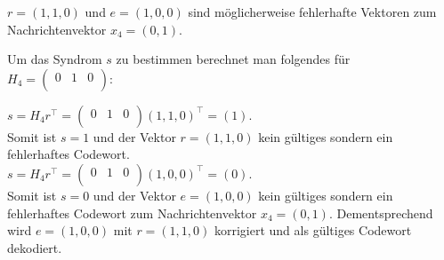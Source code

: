 \begin{Beispiel}[Dekodierung]
        $r = (1,1,0)$ und $e = (1,0,0)$ sind möglicherweise fehlerhafte Vektoren zum Nachrichtenvektor 
    $x_4 = (0,1)$.
    
    Um das Syndrom $s$ zu bestimmen berechnet man folgendes für  $H_4=\left( \begin{array}{rrr}
        0 & 1 & 0 \\
       \end{array}\right) 
    $:
    
    $s = H_4r^\intercal = $$\left( \begin{array}{rrr}
        0 & 1 & 0 \\
       \end{array}\right) 
    $$(1,1,0)^\intercal = (1).$\\
    
    Somit ist $s = 1$ und der Vektor $r = (1,1,0)$ kein gültiges sondern ein fehlerhaftes Codewort.\\
    $s = H_4r^\intercal = $$\left( \begin{array}{rrr}
        0 & 1 & 0 \\
       \end{array}\right) 
    $$(1,0,0)^\intercal = (0).$\\
    
    Somit ist $s = 0$ und der Vektor $e = (1,0,0)$ kein gültiges sondern ein fehlerhaftes Codewort zum Nachrichtenvektor 
    $x_4 = (0,1)$. Dementsprechend wird $e = (1,0,0)$ mit $r = (1,1,0)$ korrigiert und als gültiges Codewort dekodiert.\\
    
\end{Beispiel}
